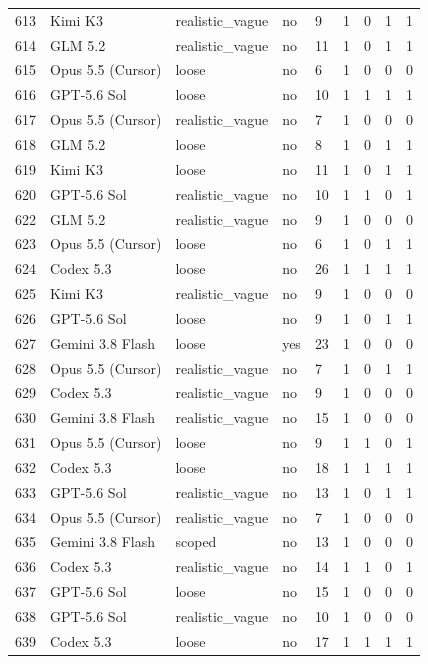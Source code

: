 \begin{tabular}{lllllllll}
613 & Kimi K3 & realistic\_vague & no & 9 & 1 & 0 & 1 & 1 \\
614 & GLM 5.2 & realistic\_vague & no & 11 & 1 & 0 & 1 & 1 \\
615 & Opus 5.5 (Cursor) & loose & no & 6 & 1 & 0 & 0 & 0 \\
616 & GPT-5.6 Sol & loose & no & 10 & 1 & 1 & 1 & 1 \\
617 & Opus 5.5 (Cursor) & realistic\_vague & no & 7 & 1 & 0 & 0 & 0 \\
618 & GLM 5.2 & loose & no & 8 & 1 & 0 & 1 & 1 \\
619 & Kimi K3 & loose & no & 11 & 1 & 0 & 1 & 1 \\
620 & GPT-5.6 Sol & realistic\_vague & no & 10 & 1 & 1 & 0 & 1 \\
622 & GLM 5.2 & realistic\_vague & no & 9 & 1 & 0 & 0 & 0 \\
623 & Opus 5.5 (Cursor) & loose & no & 6 & 1 & 0 & 1 & 1 \\
624 & Codex 5.3 & loose & no & 26 & 1 & 1 & 1 & 1 \\
625 & Kimi K3 & realistic\_vague & no & 9 & 1 & 0 & 0 & 0 \\
626 & GPT-5.6 Sol & loose & no & 9 & 1 & 0 & 1 & 1 \\
627 & Gemini 3.8 Flash & loose & yes & 23 & 1 & 0 & 0 & 0 \\
628 & Opus 5.5 (Cursor) & realistic\_vague & no & 7 & 1 & 0 & 1 & 1 \\
629 & Codex 5.3 & realistic\_vague & no & 9 & 1 & 0 & 0 & 0 \\
630 & Gemini 3.8 Flash & realistic\_vague & no & 15 & 1 & 0 & 0 & 0 \\
631 & Opus 5.5 (Cursor) & loose & no & 9 & 1 & 1 & 0 & 1 \\
632 & Codex 5.3 & loose & no & 18 & 1 & 1 & 1 & 1 \\
633 & GPT-5.6 Sol & realistic\_vague & no & 13 & 1 & 0 & 1 & 1 \\
634 & Opus 5.5 (Cursor) & realistic\_vague & no & 7 & 1 & 0 & 0 & 0 \\
635 & Gemini 3.8 Flash & scoped & no & 13 & 1 & 0 & 0 & 0 \\
636 & Codex 5.3 & realistic\_vague & no & 14 & 1 & 1 & 0 & 1 \\
637 & GPT-5.6 Sol & loose & no & 15 & 1 & 0 & 0 & 0 \\
638 & GPT-5.6 Sol & realistic\_vague & no & 10 & 1 & 0 & 0 & 0 \\
639 & Codex 5.3 & loose & no & 17 & 1 & 1 & 1 & 1 \\

\end{tabular}
